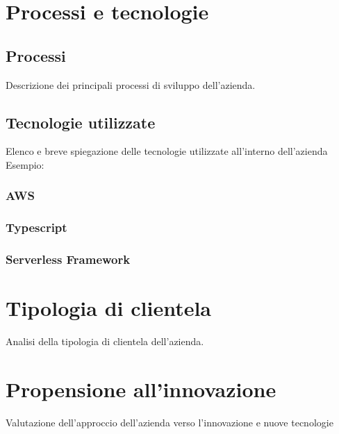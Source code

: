 \section{Processi e tecnologie}
\subsection{Processi}
Descrizione dei principali processi di sviluppo dell'azienda.
\subsection{Tecnologie utilizzate}
Elenco e breve spiegazione delle tecnologie utilizzate all'interno dell'azienda
Esempio:
\subsubsection{AWS}
\subsubsection{Typescript}
\subsubsection{Serverless Framework}




\section{Tipologia di clientela}
Analisi della tipologia di clientela dell'azienda.

\section{Propensione all'innovazione}
Valutazione dell'approccio dell'azienda verso l'innovazione e nuove tecnologie



